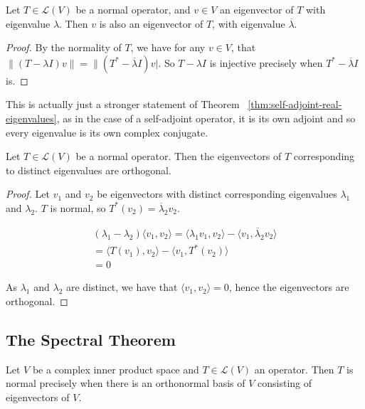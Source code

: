 \documentclass[]{article}
\begin{document}
\begin{thm}
		Let $T \in \mathcal{L}(V)$ be a normal operator, and $v \in V$ an eigenvector of $T$ with eigenvalue $\lambda$. Then $v$ is also an eigenvector of $T$, with eigenvalue $\overline \lambda$.
\end{thm}

\begin{proof}
		By the normality of $T$, we have for any $v \in V$, that $\|(T - \lambda I) v\| = \|(T^* - \overline \lambda I) v|$. So $T - \lambda I$ is injective precisely when $T^* - \overline \lambda I$ is. 
\end{proof}

This is actually just a stronger statement of Theorem ~\ref{thm:self-adjoint-real-eigenvalues}, as in the case of a self-adjoint operator, it is its own adjoint and so every eigenvalue is its own complex conjugate.

\begin{thm}
		Let $T \in \mathcal{L}(V)$ be a normal operator. Then the eigenvectors of $T$ corresponding to distinct eigenvalues are orthogonal.	
\end{thm}

\begin{proof}
		Let $v_1$ and $v_2$ be eigenvectors with distinct corresponding eigenvalues $\lambda_1$ and $\lambda_2$. $T$ is normal, so $T^*(v_2) = \overline \lambda_2 v_2$.

		\begin{align*}
				(\lambda_1 - \lambda_2) \langle v_1, v_2 \rangle = \langle \lambda_1 v_1, v_2 \rangle - \langle v_1, \overline \lambda_2 v_2 \rangle \\
				= \langle T(v_1), v_2 \rangle - \langle v_1, T^*(v_2) \rangle \\
				= 0
		\end{align*}

		As $\lambda_1$ and $\lambda_2$ are distinct, we have that $\langle v_1, v_2 \rangle = 0$, hence the eigenvectors are orthogonal.
\end{proof}

\subsection{The Spectral Theorem}

\begin{thm} 
		Let $V$ be a complex inner product space and $T \in \mathcal{L}(V)$ an operator. Then $T$ is normal precisely when there is an orthonormal basis of $V$ consisting of eigenvectors of $V$.
\end{thm}
\end{document}
